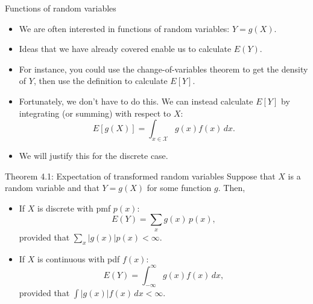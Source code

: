 \begin{frame}[allowframebreaks]{Functions of random variables}
  \begin{itemize}
    \item We are often interested in functions of random variables: $Y = g(X)$.
    \item Ideas that we have already covered enable us to calculate $E(Y)$.
    \item For instance, you could use the change-of-variables theorem to get the density of $Y$, then use the definition to calculate $E[Y]$.
    \item Fortunately, we don't have to do this. We can instead calculate $E[Y]$ by integrating (or summing) with respect to $X$:
    $$
    E[g(X)] = \int_{x \in \mathcal{X}} g(x)f(x) \, dx.
    $$
    \item We will justify this for the discrete case.
  \end{itemize}
  
  \framebreak
  
  \begin{block}{Theorem 4.1: Expectation of transformed random variables}
    Suppose that $X$ is a random variable and that $Y = g(X)$ for some function $g$. Then,
    \begin{itemize}
      \item If $X$ is discrete with pmf $p(x)$:
      $$
      E(Y) = \sum_x g(x)\, p(x),
      $$
      provided that $\sum_x |g(x)| p(x) < \infty$.
      \item If $X$ is continuous with pdf $f(x)$:
      $$
      E(Y) = \int_{-\infty}^\infty g(x) f(x)\, dx,
      $$
      provided that $\int |g(x)| f(x) \, dx < \infty$.
    \end{itemize}
  \end{block}
  
  \end{frame}
  
